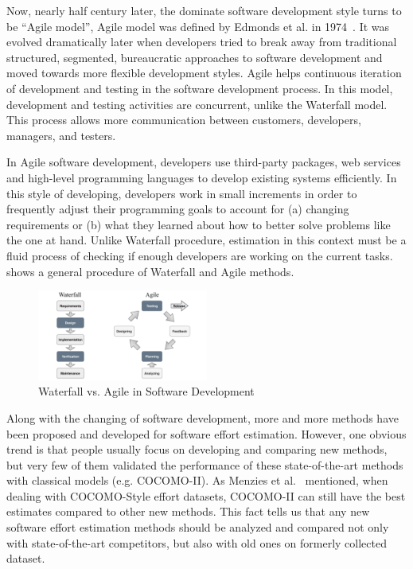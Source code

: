 Now, nearly half century later, the dominate software development style turns to be ``Agile model'', Agile model was defined by Edmonds et al. in 1974~\cite{edmonds1974process}. It was evolved dramatically later when developers tried to break away from traditional structured, segmented, bureaucratic approaches to software development and moved towards more flexible development styles. Agile helps continuous iteration of development and testing in the software development process. In this model, development and testing activities are concurrent, unlike the Waterfall model. This process allows more communication between customers, developers, managers, and testers.

In Agile software development, developers use third-party packages, web services and high-level programming languages to develop existing systems efficiently. In this style of developing, developers work in small increments in order to frequently adjust their programming goals to account for (a) changing requirements or (b) what they learned about how to better solve problems like the one at hand. Unlike Waterfall procedure, estimation in this context must be a fluid process of checking if enough developers are working on the current tasks.  shows a general procedure of Waterfall and Agile methods.


\begin{figure}
\centerline{\includegraphics[width=0.5\textwidth]{water_grey.pdf}}
\caption{Waterfall vs. Agile in Software Development}    
\label{fig:water}
\end{figure}



Along with the changing of software development, more and more methods have been proposed and developed for software effort estimation. However,  one obvious trend is that people usually focus on developing and comparing new methods, but very few of them validated the performance of these state-of-the-art methods with classical models (e.g. COCOMO-II). As Menzies et al.~\cite{MenziesNeg:2017} mentioned, when dealing with COCOMO-Style effort datasets, COCOMO-II can still have the best estimates compared to other new methods. This fact tells us that any new software effort estimation methods should be analyzed and compared not only with state-of-the-art competitors, but also with old ones on formerly collected dataset. 


